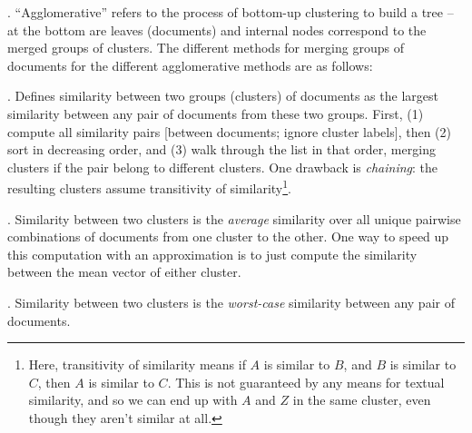 \documentclass[11pt]{article}
\newcommand\myspace[1][]{\vspace{#1\bigskipamount}}
\newcommand\p{\Needspace{10\baselineskip} \noindent}
\begin{document}
\myspace
\p {}. ``Agglomerative'' refers to the process of bottom-up clustering to build a tree -- at the bottom are leaves (documents) and internal nodes correspond to the merged groups of clusters. The different methods for merging groups of documents for the different agglomerative methods are as follows:
\begin{compactitem}
	\item {}. Defines similarity between two groups (clusters) of documents as the largest similarity between any pair of documents from these two groups. First, (1) compute all similarity pairs [between documents; ignore cluster labels], then (2) sort in decreasing order, and (3) walk through the list in that order, merging clusters if the pair belong to different clusters. One drawback is \textit{chaining}: the resulting clusters assume transitivity of similarity\footnote{Here, transitivity of similarity means if $A$ is similar to $B$, and $B$ is similar to $C$, then $A$ is similar to $C$. This is not guaranteed by any means for textual similarity, and so we can end up with $A$ and $Z$ in the same cluster, even though they aren't similar at all. }.
	
	\item {}. Similarity between two clusters is the \textit{average} similarity over all unique pairwise combinations of documents from one cluster to the other. One way to speed up this computation with an approximation is to just compute the similarity between the mean vector of either cluster. 
	
	\item {}. Similarity between two clusters is the \textit{worst-case} similarity between any pair of documents. 
\end{compactitem}
\end{document}
